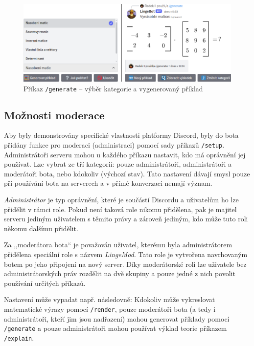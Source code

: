 \documentclass[FM]{tulthesis}
\begin{document}
	\begin{figure}[ht]
		\centering
		\includegraphics[width=\textwidth]{img/5X/Generate}
		\caption{Příkaz \texttt{/generate} – výběr kategorie a vygenerovaný příklad}
	\end{figure}
		
	\subsection{Možnosti moderace}
	
	Aby byly demonstrovány specifické vlastnosti platformy Discord, byly do bota přidány funkce pro moderaci (administraci) pomocí sady příkazů \verb|/setup|. Administrátoři serveru mohou u každého příkazu nastavit, kdo má oprávnění jej používat. Lze vybrat ze tří kategorií: pouze administrátoři, administrátoři a moderátoři bota, nebo kdokoliv (výchozí stav). Tato nastavení dávají smysl pouze při používání bota na serverech a v přímé konverzaci nemají význam.
	
	\textit{Administrátor} je typ oprávnění, které je součástí Discordu a uživatelům ho lze přidělit v rámci role. Pokud není taková role nikomu přidělena, pak je majitel serveru jediným uživatelem s těmito právy a zároveň jediným, kdo může tuto roli někomu dalšímu přidělit.
	
	Za ,,moderátora bota`` je považován uživatel, kterému byla administrátorem přidělena speciální role s názvem \textit{LingeMod}. Tato role je vytvořena navrhovaným botem po jeho připojení na nový server. Díky moderátorské roli lze uživatele bez administrátorských práv rozdělit na dvě skupiny a pouze jedné z nich povolit používání určitých příkazů.
	
	Nastavení může vypadat např. následovně: Kdokoliv může vykreslovat matematické výrazy pomocí \verb|/render|, pouze moderátoři bota (a tedy i administrátoři, kteří jim jsou nadřazeni) mohou generovat příklady pomocí \verb|/generate| a pouze administrátoři mohou používat výklad teorie příkazem \verb|/explain|.
	
\end{document}

